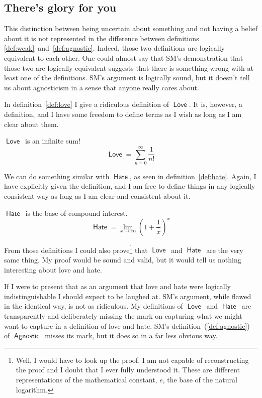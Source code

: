 \documentclass[12pt]{article}
\newcommand{\rel}[1]{\ensuremath{\mathop{\mathsf{#1}}}}
\newcommand{\rlagno}{\rel{Agnostic}}
\newcommand{\rllove}{\rel{Love}}
\newcommand{\rlhate}{\rel{Hate}}
\begin{document}
\subsection{There's glory for you}

This distinction between being uncertain about something and not having a belief about it
is not represented in the difference between definitions \ref{def:weak}~and~\ref{def:agnostic}.
Indeed, those two definitions are logically equivalent to each other.
One could almost say that SM's demonstration that those two are logically equivalent suggests that there is something wrong with at least one of the definitions.
SM's argument is logically sound, but it doesn't tell us about agnosticism in a sense that anyone really cares about.

In definition~\ref{def:love} I give a ridiculous definition of \rllove.
It is, however, a definition, and I have some freedom to define terms as I wish as long as I am clear about them.

\begin{definition}\label{def:love}
    \rllove\ is an infinite sum!
    \[
     \rllove = \sum_{n=0}^\infty \frac{1}{n!}   
    \]   
\end{definition}

We can do something similar with \rlhate, as seen in definition~\ref{def:hate}.
Again, I have explicitly given the definition, and I am free to define things in any logically consistent way as long as I am clear and consistent about it.

\begin{definition}\label{def:hate}
    \rlhate\ is the base of compound interest.
    \[
     \rlhate =  \lim_{x \to \infty}\left( 1 + \frac{1}{x}\right)^x 
    \]   
\end{definition}

From those definitions I could also prove\footnote{%
    Well, I would have to look up the proof.
    I am not capable of reconstructing the proof and I doubt that I ever fully understood it.
    These are different representations of the mathematical constant,
    $e$, the base of the natural logarithm.}
that \rllove\ and \rlhate\ are the very same thing.
My proof would be sound and valid, but it would tell us nothing interesting about love and hate.

If I were to present that as an argument that love and hate were logically indistinguishable I should expect to be laughed at.
SM's argument, while flawed in the identical way, is not as ridiculous.
My definitions of \rllove\ and \rlhate\ are transparently and deliberately missing the mark on capturing what we might want to capture in a definition of love and hate.
SM's definition~(\ref{def:agnostic}) of \rlagno\ misses its mark,
but it does so in a far less obvious way.
\end{document}
